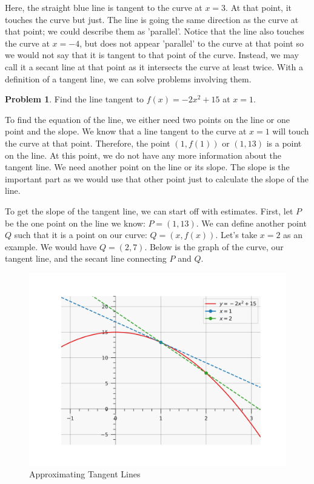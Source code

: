 \documentclass[12pt]{article}
\theoremstyle{definition}
\newtheorem{problem}{Problem}
\begin{document}
Here, the straight blue line is tangent to the curve at $x=3$.
At that point, it touches the curve but just.
The line is going the same direction as the curve at that point; we could describe them as 'parallel'.
Notice that the line also touches the curve at $x=-4$, but does not appear 'parallel' to the curve at that point so we would not say that it is tangent to that point of the curve.
Instead, we may call it a secant line at that point as it intersects the curve at least twice.
With a definition of a tangent line, we can solve problems involving them.

\begin{problem}
Find the line tangent to $f(x)=-2x^2+15$ at $x=1$. \label{eq:1}
\end{problem}

To find the equation of the line, we either need two points on the line or one point and the slope.
We know that a line tangent to the curve at $x=1$ will touch the curve at that point.
Therefore, the point $(1, f(1))$ or $(1, 13)$ is a point on the line.
At this point, we do not have any more information about the tangent line.
We need another point on the line or its slope.
The slope is the important part as we would use that other point just to calculate the slope of the line.

To get the slope of the tangent line, we can start off with estimates.
First, let $P$ be the one point on the line we know: $P=(1,13)$.
We can define another point $Q$ such that it is a point on our curve: $Q=(x, f(x))$.
Let's take $x=2$ as an example.
We would have $Q=(2,7)$.
Below is the graph of the curve, our tangent line, and the secant line connecting $P$ and $Q$.

\begin{figure}[H]
    \centering
    \includegraphics[width=12.5cm, keepaspectratio]{tangent_lines_2.png}
    \caption{Approximating Tangent Lines}
    \label{fig:fig2}
\end{figure}
\end{document}
